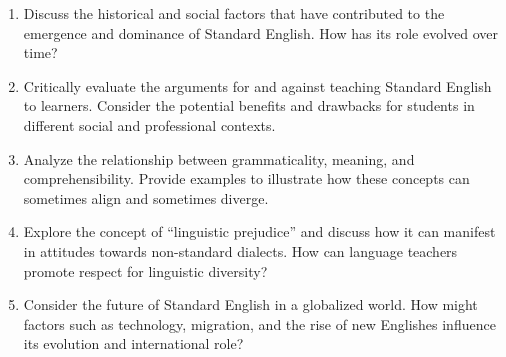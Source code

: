 \begin{tcolorbox}[title=Essay Questions, colback=white]
    
\begin{enumerate}[noitemsep]
    \item Discuss the historical and social factors that have contributed to the emergence and dominance of Standard English. How has its role evolved over time?
    \item Critically evaluate the arguments for and against teaching Standard English to learners. Consider the potential benefits and drawbacks for students in different social and professional contexts.
    \item Analyze the relationship between grammaticality, meaning, and comprehensibility. Provide examples to illustrate how these concepts can sometimes align and sometimes diverge.
    \item Explore the concept of ``linguistic prejudice'' and discuss how it can manifest in attitudes towards non-standard dialects. How can language teachers promote respect for linguistic diversity?
    \item Consider the future of Standard English in a globalized world. How might factors such as technology, migration, and the rise of new Englishes influence its evolution and international role?
\end{enumerate}
\end{tcolorbox}